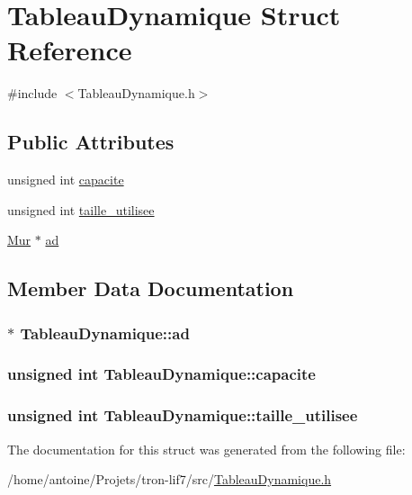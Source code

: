 \hypertarget{structTableauDynamique}{\section{Tableau\-Dynamique Struct Reference}
\label{structTableauDynamique}
}


{\ttfamily \#include $<$Tableau\-Dynamique.\-h$>$}

\subsection*{Public Attributes}
\begin{DoxyCompactItemize}
\item 
unsigned int \hyperlink{structTableauDynamique_a7ddd455f3dc2f3d94093177025945936}{capacite}
\item 
unsigned int \hyperlink{structTableauDynamique_ae55063c3127e7ee9390e572fb0ed3a58}{taille\-\_\-utilisee}
\item 
\hyperlink{structMur}{Mur} $\ast$ \hyperlink{structTableauDynamique_a803e45f9f955c1e418f972c0c606f274}{ad}
\end{DoxyCompactItemize}


\subsection{Member Data Documentation}
\hypertarget{structTableauDynamique_a803e45f9f955c1e418f972c0c606f274}{
\subsubsection[{ad}]{$\ast$ Tableau\-Dynamique\-::ad}}\label{structTableauDynamique_a803e45f9f955c1e418f972c0c606f274}
\hypertarget{structTableauDynamique_a7ddd455f3dc2f3d94093177025945936}{
\subsubsection[{capacite}]{\setlength{\rightskip}{0pt plus 5cm}unsigned int Tableau\-Dynamique\-::capacite}}\label{structTableauDynamique_a7ddd455f3dc2f3d94093177025945936}
\hypertarget{structTableauDynamique_ae55063c3127e7ee9390e572fb0ed3a58}{
\subsubsection[{taille\-\_\-utilisee}]{\setlength{\rightskip}{0pt plus 5cm}unsigned int Tableau\-Dynamique\-::taille\-\_\-utilisee}}\label{structTableauDynamique_ae55063c3127e7ee9390e572fb0ed3a58}


The documentation for this struct was generated from the following file\-:\begin{DoxyCompactItemize}
\item 
/home/antoine/\-Projets/tron-\/lif7/src/\hyperlink{TableauDynamique_8h}{Tableau\-Dynamique.\-h}\end{DoxyCompactItemize}
